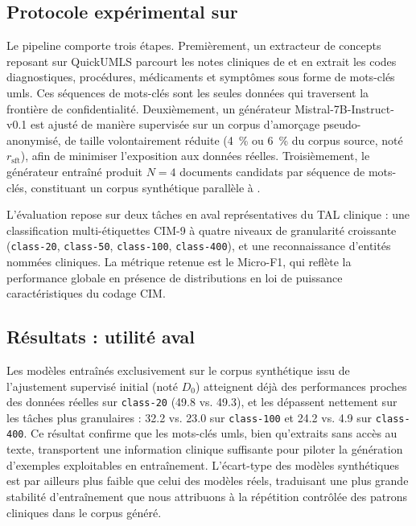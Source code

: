 \subsection{Protocole expérimental sur \mimic{}}

Le pipeline comporte trois étapes.
Premièrement, un extracteur de concepts reposant sur QuickUMLS parcourt les notes cliniques de \mimic{} et en extrait les codes diagnostiques, procédures, médicaments et symptômes sous forme de mots-clés \gls{umls}.
Ces séquences de mots-clés sont les seules données qui traversent la frontière de confidentialité.
Deuxièmement, un générateur Mistral-7B-Instruct-v0.1 est ajusté de manière supervisée sur un corpus d'amorçage pseudo-anonymisé, de taille volontairement réduite (\SI{4}{\percent} ou \SI{6}{\percent} du corpus source, noté $r_{\text{sft}}$), afin de minimiser l'exposition aux données réelles.
Troisièmement, le générateur entraîné produit $N=4$ documents candidats par séquence de mots-clés, constituant un corpus synthétique parallèle à \mimic{}.

L'évaluation repose sur deux tâches en aval représentatives du TAL clinique : une classification multi-étiquettes CIM-9 à quatre niveaux de granularité croissante (\texttt{class-20}, \texttt{class-50}, \texttt{class-100}, \texttt{class-400}), et une reconnaissance d'entités nommées cliniques.
La métrique retenue est le Micro-F1, qui reflète la performance globale en présence de distributions en loi de puissance caractéristiques du codage CIM.

\subsection{Résultats : utilité aval}

Les modèles entraînés exclusivement sur le corpus synthétique issu de l'ajustement supervisé initial (noté $D_0$) atteignent déjà des performances proches des données réelles sur \texttt{class-20} (\num{49.8} vs. \num{49.3}), et les dépassent nettement sur les tâches plus granulaires : \num{32.2} vs. \num{23.0} sur \texttt{class-100} et \num{24.2} vs. \num{4.9} sur \texttt{class-400}.
Ce résultat confirme que les mots-clés \gls{umls}, bien qu'extraits sans accès au texte, transportent une information clinique suffisante pour piloter la génération d'exemples exploitables en entraînement.
L'écart-type des modèles synthétiques est par ailleurs plus faible que celui des modèles réels, traduisant une plus grande stabilité d'entraînement que nous attribuons à la répétition contrôlée des patrons cliniques dans le corpus généré.
